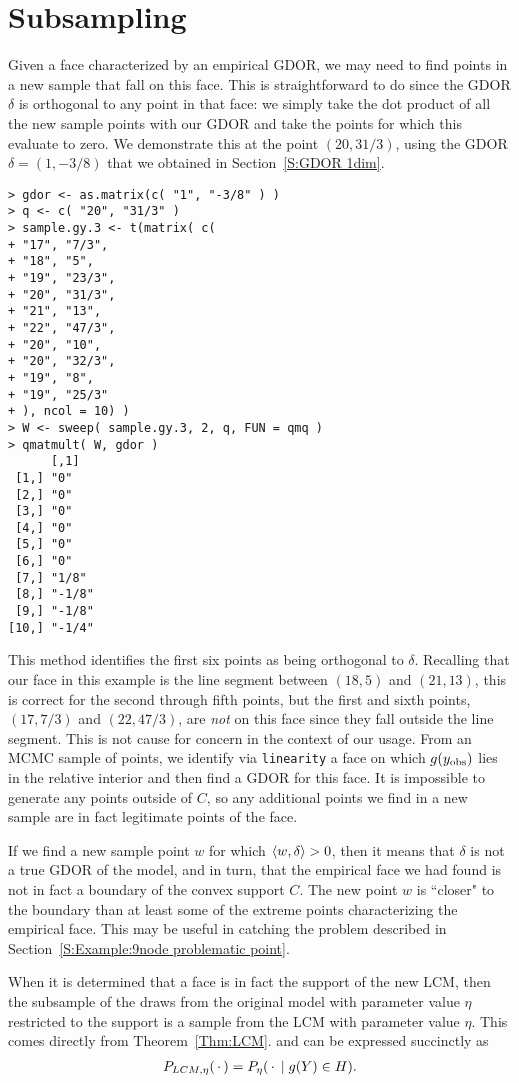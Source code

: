\section{Subsampling} \label{S:Subsampling}
Given a face characterized by an empirical GDOR, we may need to
find points in a new sample that fall on this face.  This is straightforward to
do since the GDOR $\delta$ is orthogonal to any point in that face:
we simply take the dot product of all the new sample points with our GDOR
and take the points for which this evaluate to zero.
We demonstrate this at the point $(20, 31/3)$, using the GDOR $\delta = (1, -3/8)$
that we obtained in Section~\ref{S:GDOR 1dim}.
{\singlespace
\begin{verbatim}
> gdor <- as.matrix(c( "1", "-3/8" ) )
> q <- c( "20", "31/3" )
> sample.gy.3 <- t(matrix( c(
+ "17", "7/3",
+ "18", "5",
+ "19", "23/3",
+ "20", "31/3",
+ "21", "13",
+ "22", "47/3",
+ "20", "10",
+ "20", "32/3",
+ "19", "8",
+ "19", "25/3"
+ ), ncol = 10) )
> W <- sweep( sample.gy.3, 2, q, FUN = qmq )
> qmatmult( W, gdor )
      [,1]  
 [1,] "0"   
 [2,] "0"   
 [3,] "0"   
 [4,] "0"   
 [5,] "0"   
 [6,] "0"   
 [7,] "1/8" 
 [8,] "-1/8"
 [9,] "-1/8"
[10,] "-1/4"
\end{verbatim}
}
This method identifies the first six points as being orthogonal to $\delta$.
Recalling that our face in this example is the line segment between $(18,5)$ and $(21,13)$,
this is correct for the second through fifth points, but
the first and sixth points, $(17, 7/3)$ and $(22,47/3)$, 
are \emph{not} on this face since they fall outside the line segment.  
This is not cause for concern in the context of our usage.  From an MCMC sample of points,
we identify via \texttt{linearity} a face on which $g(y_{\text{obs}})$ lies in the relative
interior and then find a GDOR for this face.  It is impossible to generate any
points outside of $C$, so any additional points we find in a new sample are in fact legitimate 
points of the face.  

If we find a new sample point $w$ for which $\langle w, \delta \rangle > 0$, then it means that 
$\delta$ is not a true GDOR of the model, and in turn, that the empirical face we had
found is not in fact a boundary of the convex support $C$.  The new point $w$ is ``closer"
to the boundary than at least some of the extreme points characterizing the empirical face.
This may be useful in catching the problem described in 
Section~\ref{S:Example:9node problematic point}.

When it is determined that a face is in fact the support of the new LCM,
then the subsample of the draws from the original model with parameter value $\eta$ 
restricted to the support is a sample from the LCM with 
parameter value $\eta$.  This comes directly from Theorem~\ref{Thm:LCM}.
 and can be expressed succinctly as
\begin{align*}
P_{LCM, \eta}(\,\cdot\,) = P_\eta( \,\cdot\, \mid g(Y) \in H ).
\end{align*}


